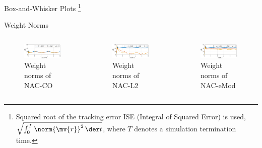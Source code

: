 \documentclass[8pt, aspectratio=169, handout]{beamer}
\begin{document}
\begin{frame}{\insertsubsectionhead}{Box-and-Whisker Plots}
    \let\thefootnote\relax\footnote{
      Squared root of the tracking error ISE (Integral of Squared Error) is used, \ie $\sqrt{\int_0^T \norm{\mv{r}}^2\,\der t}$, where $T$ denotes a simulation termination time.
    }
    
\end{frame}

\begin{frame}{\insertsubsectionhead}{Weight Norms}

  \begin{columns}


      \begin{figure}
        \includegraphics[width=0.99\textwidth]{figures/ECC/fig8.eps}
        \caption{Weight norms of NAC-CO}
      \end{figure}


      \begin{figure}      
        \includegraphics[width=0.99\textwidth]{figures/ECC/fig9.eps}
        \caption{Weight norms of NAC-L2}
      \end{figure}
      

      \begin{figure}
        \includegraphics[width=0.99\textwidth]{figures/ECC/fig10.eps}
        \caption{Weight norms of NAC-eMod}
      \end{figure}
    

\end{columns}
\end{frame}
\end{document}
